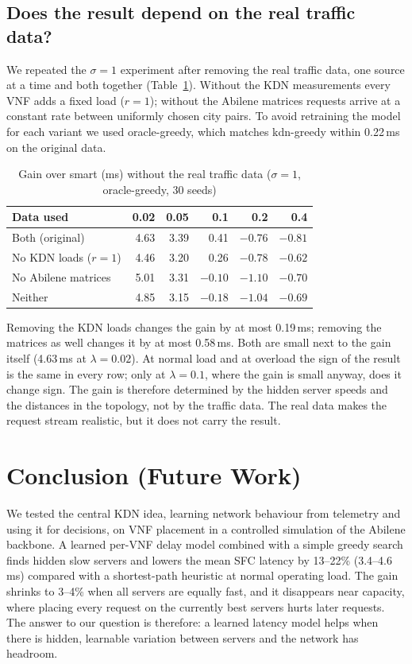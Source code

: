 \documentclass[conference,a4paper]{IEEEtran}
\begin{document}
\subsection{Does the result depend on the real traffic data?}
We repeated the $\sigma = 1$ experiment after removing the real traffic data, one source at a time and both
together (Table~\ref{tab:ablation}). Without the KDN measurements every VNF adds a fixed load ($r = 1$); without the
Abilene matrices requests arrive at a constant rate between uniformly chosen city pairs. To avoid retraining the
model for each variant we used oracle-greedy, which matches kdn-greedy within 0.22\,ms on the original data.

\begin{table}[t]
\caption{Gain over smart (ms) without the real traffic data ($\sigma = 1$, oracle-greedy, 30 seeds)}
\label{tab:ablation}
\centering
\footnotesize
\begin{tabular}{@{}lrrrrr@{}}
\toprule
Data used & 0.02 & 0.05 & 0.1 & 0.2 & 0.4 \\
\midrule
Both (original) & 4.63 & 3.39 & 0.41 & $-0.76$ & $-0.81$ \\
No KDN loads ($r = 1$) & 4.46 & 3.20 & 0.26 & $-0.78$ & $-0.62$ \\
No Abilene matrices & 5.01 & 3.31 & $-0.10$ & $-1.10$ & $-0.70$ \\
Neither & 4.85 & 3.15 & $-0.18$ & $-1.04$ & $-0.69$ \\
\bottomrule
\end{tabular}
\end{table}

Removing the KDN loads changes the gain by at most 0.19\,ms; removing the matrices as well changes it by at most
0.58\,ms. Both are small next to the gain itself (4.63\,ms at $\lambda = 0.02$). At normal load and at overload the sign of the result is the same in every row; only at $\lambda = 0.1$,
where the gain is small anyway, does it change sign. The gain is therefore
determined by the hidden server speeds and the distances in the topology, not by the traffic data. The real data
makes the request stream realistic, but it does not carry the result.

\section{Conclusion (Future Work)}
We tested the central KDN idea, learning network behaviour from telemetry and using it for decisions, on VNF
placement in a controlled simulation of the Abilene backbone. A learned per-VNF delay model combined with a simple
greedy search finds hidden slow servers and lowers the mean SFC latency by 13--22\% (3.4--4.6\,ms) compared with a
shortest-path heuristic at normal operating load. The gain shrinks to 3--4\% when all servers are equally
fast, and it disappears near capacity, where placing every request on the currently best servers hurts later
requests. The answer to our question is therefore: a learned latency model helps when there is hidden, learnable
variation between servers and the network has headroom.
\end{document}
